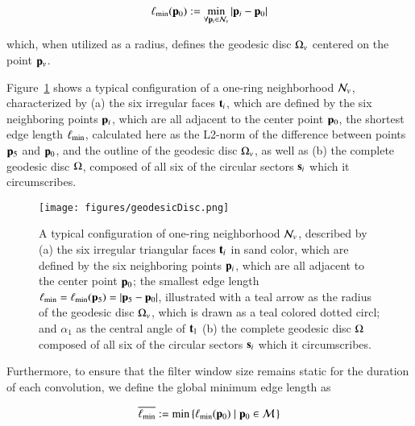 \begin{equation}
	\ell_\text{min}(\mathbf{p}_0) := \min_{\forall \mathbf{p}_i \in \mathcal{N}_v}|\mathbf{p}_i - \mathbf{p}_0|
	\label{eq:localMinimumEdgeLength}
\end{equation}%
%
%

which, when utilized as a radius, defines the geodesic disc $\Omega_v$ centered on the point $\mathbf{p}_v$.

Figure~\ref{fig:geodesicDisc} shows a typical configuration of a one-ring neighborhood $\mathcal{N}_v$, characterized by (a) the six irregular faces $\mathbf{t}_i$, which are defined by the six neighboring points $\mathbf{p}_i$, which are all adjacent to the center point $\mathbf{p}_0$, the shortest edge length $\ell_\text{min}$, calculated here as the L2-norm of the difference between points $\mathbf{p}_5$ and $\mathbf{p}_0$, and the outline of the geodesic disc $\Omega_v$, as well as (b) the complete geodesic disc $\Omega$, composed of all six of the circular sectors $\mathbf{s}_i$ which it circumscribes.

\begin{figure}[ht]
\ffigbox
	{\texttt{[image: figures/geodesicDisc.png]}}
	{\caption[A One-Ring Neighborhood and its Geodesic Disc]{A typical configuration of one-ring neighborhood $\mathcal{N}_v$, described by (a) the six irregular triangular faces $\mathbf{t}_i$ in sand color, which are defined by the six neighboring points $\mathbf{p}_i$, which are all adjacent to the center point $\mathbf{p}_0$; the smallest edge length $\ell_\text{min} = \ell_\text{min}(\mathbf{p}_5) = |\mathbf{p}_5 - \mathbf{p}_0|$, illustrated with a teal arrow as the radius of the geodesic disc $\Omega_v$, which is drawn as a teal colored dotted circl; and $\alpha_1$ as the central angle of $\mathbf{t}_1$ (b) the complete geodesic disc $\Omega$ composed of all six of the circular sectors $\mathbf{s}_i$ which it circumscribes.}\label{fig:geodesicDisc}}
\end{figure}%

Furthermore, to ensure that the filter window size remains static for the duration of each convolution, we define the global minimum edge length as

\begin{equation}
	\overline{\ell_\text{min}} := \min\left \{\ell_\text{min}(\mathbf{p}_0) \;|\; \mathbf{p}_0 \in \mathcal{M}\,\right \}
	\label{eq:globalMinimumEdgeLength}
\end{equation}%
%


